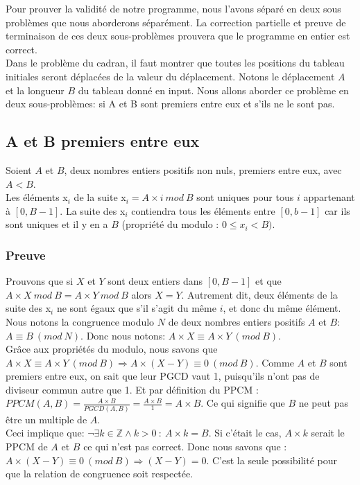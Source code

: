Pour prouver la validité de notre programme, nous l'avons séparé en deux sous problèmes que nous aborderons séparément. La correction partielle et preuve de terminaison de ces deux sous-problèmes prouvera que le programme en entier est correct.\\
Dans le problème du cadran, il faut montrer que toutes les positions du tableau initiales seront déplacées de la valeur du déplacement. Notons le déplacement $A$ et la longueur $B$ du tableau donné en input. Nous allons aborder ce problème en deux sous-problèmes: si A et B sont premiers entre eux et s'ils ne le sont pas.\\  

\subsection{A et B premiers entre eux}
Soient $A$ et $B$, deux nombres entiers positifs non nuls, premiers entre eux, avec $A < B$.\\
Les éléments x$_{i}$ de la suite x$_{i} = A \times i\ mod\ B$ sont uniques pour tous $i$ appartenant à $[0, B-1]$.
La suite des x$_{i}$ contiendra tous les éléments entre $[0, b-1]$ car ils sont uniques et il y en a $B$ (propriété du modulo : $0\leq x_i < B)$.

\subsubsection* {Preuve}
Prouvons que si $X$ et $Y$ sont deux entiers dans $[0, B-1]$ et que $A\times X\ mod\ B = A\times Y\ mod\ B$ alors $X = Y$. Autrement dit, deux éléments de la suite des x$_{i}$ ne sont égaux que s'il s'agit du même $i$, et donc du même élément. Nous notons la congruence modulo $N$ de deux nombres entiers positifs $A$ et $B$: $A \equiv B\ (mod\ N)$. Donc nous notons: $A\times X ≡ A\times Y\ (mod\ B)$.\\

Grâce aux propriétés du modulo, nous savons que $A\times X ≡ A\times Y\ (mod\ B) \Rightarrow A\times (X-Y) ≡ 0\ (mod\ B).$ Comme $A$ et $B$ sont premiers entre eux, on sait que leur PGCD vaut 1, puisqu'ils n'ont pas de diviseur commun autre que 1. Et par définition du PPCM : $PPCM(A,B) = \frac{A\times B}{PGCD(A,B)} = \frac{A\times B} {1} = A\times B$. Ce qui signifie que $B$ ne peut pas être un multiple de $A$.\\

Ceci implique que: $\neg  \exists k \in \mathbb{Z} \wedge k>0\ :\ A\times k = B$. Si c'était le cas, $A\times k$ serait le PPCM de $A$ et $B$ ce qui n'est pas correct. Donc nous savons que : $A\times (X-Y) ≡ 0\ (mod\ B) \Rightarrow (X-Y) = 0$. C'est la seule possibilité pour que la relation de congruence soit respectée.\\


